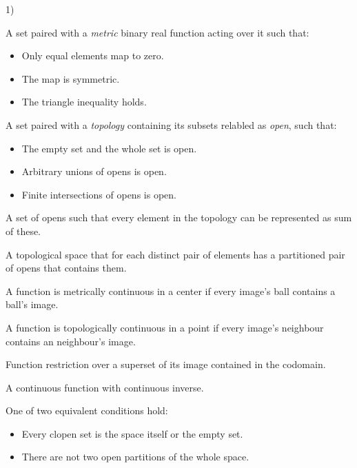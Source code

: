 \begin{multicols}{3}
  1)
\end{multicols}

\begin{multicols*}{3}
  A set paired with a \textit{metric} binary real function acting over it such that:
  \begin{itemize}
  \item Only equal elements map to zero.
  \item The map is symmetric.
  \item The triangle inequality holds.
  \end{itemize}

  A set paired with a \textit{topology} containing its subsets relabled as \textit{open}, such that:
  \begin{itemize}
  \item The empty set and the whole set is open.
  \item Arbitrary unions of opens is open.
  \item Finite intersections of opens is open.
  \end{itemize}

  A set of opens such that every element in the topology can be represented as sum of these.

  A topological space that for each distinct pair of elements has a partitioned pair of opens that contains them.

  A function is metrically continuous in a center if every image's ball contains a ball's image.

  A function is topologically continuous in a point if every image's neighbour contains an neighbour's image.

  Function restriction over a superset of its image contained in the codomain.

  A continuous function with continuous inverse.
  
  One of two equivalent conditions hold:
  \begin{itemize}
  \item Every clopen set is the space itself or the empty set.
  \item There are not two open partitions of the whole space.
  \end{itemize}


\end{multicols*}
